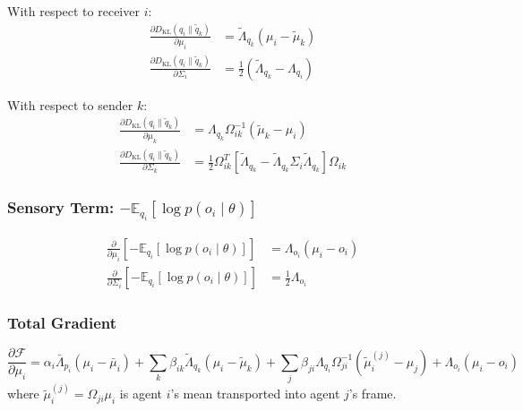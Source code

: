 \documentclass[12pt]{article}
\begin{document}
With respect to receiver $i$:
\begin{align}
\frac{\partial D_{\mathrm{KL}}(q_i \| \tilde{q}_k)}{\partial \mu_i} &= \tilde{\Lambda}_{q_k}(\mu_i - \tilde{\mu}_k) \label{eq:grad_consensus_mu_i} \\[6pt]
\frac{\partial D_{\mathrm{KL}}(q_i \| \tilde{q}_k)}{\partial \Sigma_i} &= \frac{1}{2}(\tilde{\Lambda}_{q_k} - \Lambda_{q_i}) \label{eq:grad_consensus_sigma_i}
\end{align}

With respect to sender $k$:
\begin{align}
\frac{\partial D_{\mathrm{KL}}(q_i \| \tilde{q}_k)}{\partial \mu_k} &= \Lambda_{q_k}\Omega_{ik}^{-1}(\tilde{\mu}_k - \mu_i) \label{eq:grad_consensus_mu_k} \\[6pt]
\frac{\partial D_{\mathrm{KL}}(q_i \| \tilde{q}_k)}{\partial \Sigma_k} &= \frac{1}{2}\Omega_{ik}^T\left[\tilde{\Lambda}_{q_k} - \tilde{\Lambda}_{q_k}\Sigma_i\tilde{\Lambda}_{q_k}\right]\Omega_{ik} \label{eq:grad_consensus_sigma_k}
\end{align}

\subsubsection{Sensory Term: $-\mathbb{E}_{q_i}[\log p(o_i \mid \theta)]$}

\begin{align}
\frac{\partial}{\partial \mu_i}\left[-\mathbb{E}_{q_i}[\log p(o_i \mid \theta)]\right] &= \Lambda_{o_i}(\mu_i - o_i) \label{eq:grad_sensory_mu} \\[6pt]
\frac{\partial}{\partial \Sigma_i}\left[-\mathbb{E}_{q_i}[\log p(o_i \mid \theta)]\right] &= \frac{1}{2}\Lambda_{o_i} \label{eq:grad_sensory_sigma}
\end{align}

\subsubsection{Total Gradient}

\begin{equation}
\boxed{
\frac{\partial \mathcal{F}}{\partial \mu_i} = \alpha_i\bar{\Lambda}_{p_i}(\mu_i - \bar{\mu}_i) + \sum_k \beta_{ik}\tilde{\Lambda}_{q_k}(\mu_i - \tilde{\mu}_k) + \sum_j \beta_{ji}\Lambda_{q_i}\Omega_{ji}^{-1}(\tilde{\mu}_i^{(j)} - \mu_j) + \Lambda_{o_i}(\mu_i - o_i)
}
\label{eq:total_gradient_mu}
\end{equation}
%
where $\tilde{\mu}_i^{(j)} = \Omega_{ji}\mu_i$ is agent $i$'s mean transported into agent $j$'s frame.
\end{document}
